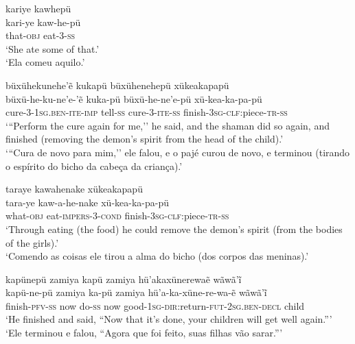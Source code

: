 \documentclass[output=paper,
modfonts,nonflat
]{langsci/langscibook}
\begin{document}
\ea  kariye kawhepü \\[.3em]
 \gll 	kari-ye kaw-he-pü\\ 
that-\textsc{obj} eat-3-\textsc{ss}\\
\glt    `She ate some of that.'\\
`Ela comeu aquilo.' \\
\z

\ea büxühekunehe'ẽ kukapü büxühenehepü xükeakapapü\\[.3em]
\gll büxü-he-ku-ne'e-'ẽ kuka-pü büxü-he-ne'e-pü xü-kea-ka-pa-pü \\
cure-3-\textsc{1sg.ben-ite-imp} tell-\textsc{ss} cure-3-\textsc{ite-ss} finish-\textsc{3sg}-\textsc{clf:}piece-\textsc{tr-ss}\\
\glt `{``}Perform the cure again for me,'' he said, and the shaman did so again, and finished (removing the demon's spirit from the head of the child).' \\
`{``}Cura de novo para mim,'' ele falou, e o pajé curou de novo, e terminou (tirando o espírito do bicho da cabeça da criança).'
\z

\ea   taraye kawahenake xükeakapapü \\[.3em]
\gll 	tara-ye kaw-a-he-nake xü-kea-ka-pa-pü\\
what-\textsc{obj} eat-\textsc{impers}-3-\textsc{cond} finish-\textsc{3sg}-\textsc{clf:}piece-\textsc{tr-ss} \\
\glt    `Through eating (the food) he could remove the demon's spirit (from the bodies of the girls).' \\
`Comendo as coisas ele tirou a alma do bicho (dos corpos das meninas).'\\
\z

\ea  kapünepü zamiya kapü zamiya hü'akaxünerewaẽ wãwã'ĩ \\[.3em]
\gll 	kapü-ne-pü zamiya ka-pü zamiya hü'a-ka-xüne-re-wa-ẽ wãwã'ĩ\\
finish-\textsc{pfv-ss} now do-\textsc{ss} now good-\textsc{1sg}-\textsc{dir:}return-\textsc{fut}-\textsc{2sg.ben}-\textsc{decl} child\\                        
\glt  `He finished and said, ``Now that it's done, your children will get well again.{''}' \\  
`Ele terminou e falou, ``Agora que foi feito, suas filhas vão sarar.{''}'
\z
\end{document}
